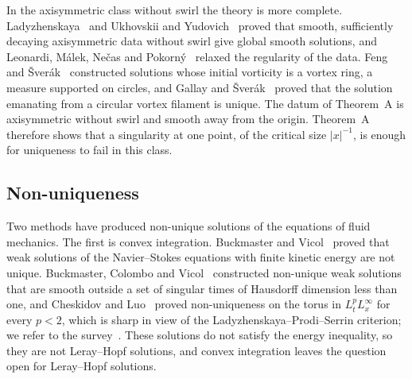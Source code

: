 \documentclass[11pt]{article}
\numberwithin{equation}{section}
\theoremstyle{definition}
\theoremstyle{remark}
\theoremstyle{plain}
\begin{document}
In the axisymmetric class without swirl the theory is more complete.
Ladyzhenskaya~\cite{ladyzhenskaya1968} and Ukhovskii and
Yudovich~\cite{ukhovskii-yudovich1968} proved that smooth, sufficiently
decaying axisymmetric data without swirl give global smooth solutions, and
Leonardi, M\'alek, Ne\v cas and Pokorn\'y~\cite{lmnp1999} relaxed the
regularity of the data. Feng and \v Sver\'ak~\cite{feng-sverak2015}
constructed solutions whose initial vorticity is a vortex ring, a measure
supported on circles, and Gallay and \v Sver\'ak~\cite{gallay-sverak2019}
proved that the solution emanating from a circular vortex filament is
unique. The datum of Theorem~A is axisymmetric without swirl and smooth
away from the origin. Theorem~A therefore shows that a singularity at one
point, of the critical size $|x|^{-1}$, is enough for uniqueness to fail
in this class.

\subsection{Non-uniqueness}
\label{sec:intro-nonuniqueness}

Two methods have produced non-unique solutions of the equations of fluid
mechanics. The first is convex integration.
Buckmaster and Vicol~\cite{buckmaster-vicol2019} proved that weak solutions of the
Navier--Stokes equations with finite kinetic energy are not unique.
Buckmaster, Colombo and Vicol~\cite{bcv2022} constructed non-unique weak
solutions that are smooth outside a set of singular times of Hausdorff
dimension less than one, and Cheskidov and Luo~\cite{cheskidov-luo2022}
proved non-uniqueness on the torus in $L^p_tL^\infty_x$ for every $p<2$,
which is sharp in view of the Ladyzhenskaya--Prodi--Serrin criterion; we
refer to the survey~\cite{buckmaster-vicol2021}. These solutions do not satisfy the energy inequality, so they are not
Leray--Hopf solutions, and convex integration leaves the question open for
Leray--Hopf solutions.
\end{document}
